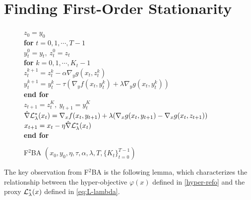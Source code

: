 \documentclass{article}
\begin{document}

\section{Finding First-Order Stationarity} \label{sec:first}

\begin{figure}
\begin{minipage}{0.48\textwidth}
\vskip -0.4cm
\begin{algorithm}[H]  
\caption{F${}^2$BA $\left(x_0,y_0, \eta,\tau,\alpha, \lambda, T,\{K_t\}_{t=0}^{T-1}\right)$} \label{alg:F2BA}
\begin{algorithmic}[1] 
\STATE $ z_0 = y_0$ \\[1mm]
\STATE \textbf{for} $ t =0,1,\cdots,T-1 $ \\[1mm]
\STATE \quad $ y_t^0 =  y_{t}, ~ z_t^0 = z_{t}$ \\[1mm]
\STATE \quad \textbf{for} $ k =0,1,\cdots,K_t-1$ \\[1mm]
\STATE \quad \quad $ z_t^{k+1} = z_t^{k}- \alpha \nabla_y g(x_t, z_t^k)   $ \\[1mm]
\STATE \quad \quad $ y_t^{k+1} = y_t^k - \tau \left( \nabla_y f(x_t,y_t^k) +  \lambda  \nabla_y g(x_t,y_t^k) \right)$ \\[1mm]
\STATE \quad \textbf{end for} \\[1mm]
\STATE \quad $z_{t+1} = z_t^K,~ y_{t+1} = y_t^K $ \\[1mm]
\STATE \quad $ \hat \nabla {\mathcal{L}}_{\lambda}^*(x_t)= \nabla_x f(x_t,y_{t+1}) + \lambda ( \nabla_x g(x_t,y_{t+1}) - \nabla_x g(x_t,z_{t+1}) )$ \\[1mm]
\STATE \quad $x_{t+1} = x_t -  \eta  \hat \nabla {\mathcal{L}}_{\lambda}^*(x_t)$ \\[1mm]
\STATE \textbf{end for} \\[1mm]
\end{algorithmic}
\end{algorithm}
\end{minipage}
\vskip -0.6cm
\end{figure}



The key observation from F${}^2$BA is the following lemma, which characterizes the relationship between the hyper-objective $\varphi(x)$ defined in \eqref{hyper-refo} and the proxy ${\mathcal{L}}_{\lambda}^*(x)$ defined in \eqref{eq:L-lambda}.
\end{document}
